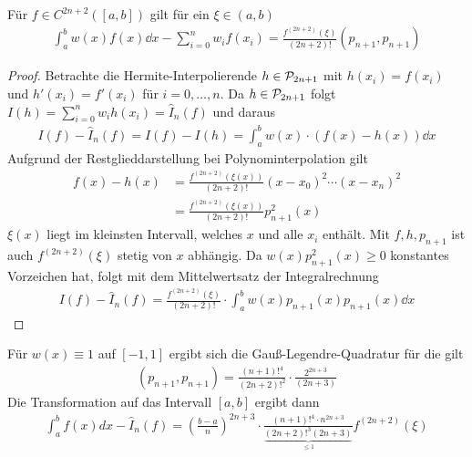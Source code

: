 \begin{Satze}[Approximationsfehler]\label{7.4.9}
  Für $f\in C^{2n+2}([a,b])$ gilt für ein $\xi\in(a,b)$
  \begin{gather}
    \int_a^bw(x)f(x)\dd x-\sum_{i=0}^nw_if(x_i) =
    \frac{f^{(2n+2)}(\xi)}{(2n+2)!}(p_{n+1},p_{n+1})
    \label{VII.4.8}
  \end{gather}
  
  \begin{proof}
    Betrachte die Hermite-Interpolierende $h\in\mathcal{P}_{2n+1}$
    mit $h(x_i)=f(x_i)$ und $h'(x_i)=f'(x_i)$ für $i=0,\dotsc,n$.
    Da $h\in\mathcal{P}_{2n+1}$ folgt $I(h)=\sum_{i=0}^nw_ih(x_i)=\hat{I}_n(f)$
    und daraus 
    \begin{gather*}
      I(f)-\hat{I}_n(f) = I(f)-I(h) 
      =\int_a^bw(x)\cdot\left( f(x)-h(x)\right) \dd x
    \end{gather*}
    Aufgrund der Restglieddarstellung bei Polynominterpolation gilt
    \begin{align*}
      f(x)-h(x) &= \frac{f^{(2n+2)}\left(\xi(x)\right)}{(2n+2)!}(x-x_0)^2
                  \dotsm (x-x_n)^2 \\
                &=\frac{f^{(2n+2)}\left(\xi(x)\right)}{(2n+2)!}p_{n+1}^2(x)
    \end{align*}
    $\xi(x)$ liegt im kleinsten Intervall, welches $x$ und alle $x_i$
    enthält.
    Mit $f,h,p_{n+1}$ ist auch $f^{(2n+2)}(\xi)$ stetig von $x$ abhängig.
    Da $w(x)p_{n+1}^2(x)\geq 0$ konstantes Vorzeichen hat,
    folgt mit dem Mittelwertsatz der Integralrechnung
    \begin{gather*}
      I(f) -\hat{I}_n(f) = \frac{f^{(2n+2)}(\xi)}{(2n+2)!}
      \cdot \int_a^bw(x)p_{n+1}(x)p_{n+1}(x)\dd x
    \end{gather*}
  \end{proof}
\end{Satze}

\label{7.4.10}
Für $w(x)\equiv 1$ auf $[-1, 1]$ ergibt sich die
Gauß-Legendre-Quadratur für die gilt 
\cite[siehe][]{haemmerlinhoffmann}
\begin{gather*}
  (p_{n+1},p_{n+1}) = \frac{(n+1)!^4}{(2n+2)!^2}
  \cdot\frac{2^{2n+3}}{(2n+3)}
\end{gather*}
Die Transformation auf das Intervall $[a, b]$ ergibt dann
\begin{gather*}
  \int_a^b f(x)dx - \hat{I}_n(f)
  = \left(\frac{b-a}{n} \right)^{2n+3}
  \cdot\frac{(n+1)!^4\cdot n^{2n+3}}
  {\underbrace{(2n+2)!^3(2n+3)}_{\leq 1}}
  f^{(2n+2)}(\xi)
\end{gather*}

